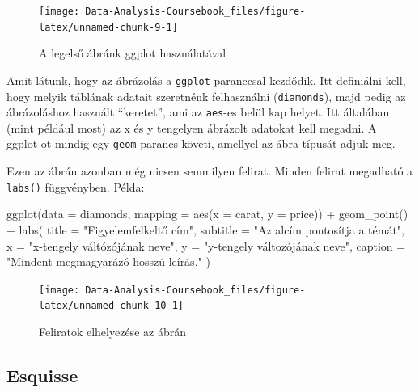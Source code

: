 \documentclass[
]{article}
\newenvironment{Shaded}{\begin{snugshade}}{\end{snugshade}}
\newcommand{\AttributeTok}[1]{\textcolor[rgb]{0.77,0.63,0.00}{#1}}
\newcommand{\FunctionTok}[1]{\textcolor[rgb]{0.00,0.00,0.00}{#1}}
\newcommand{\NormalTok}[1]{#1}
\newcommand{\SpecialCharTok}[1]{\textcolor[rgb]{0.00,0.00,0.00}{#1}}
\newcommand{\StringTok}[1]{\textcolor[rgb]{0.31,0.60,0.02}{#1}}
\begin{document}
\begin{figure}

{\centering \texttt{[image: Data-Analysis-Coursebook\_files/figure-latex/unnamed-chunk-9-1]} 

}

\caption{A legelső ábránk ggplot használatával}\label{fig:unnamed-chunk-9}
\end{figure}

Amit látunk, hogy az ábrázolás a \texttt{ggplot} paranccsal kezdődik. Itt definiálni kell, hogy melyik táblának adatait szeretnénk felhasználni (\texttt{diamonds}), majd pedig az ábrázoláshoz használt ``keretet'', ami az \texttt{aes}-es belül kap helyet. Itt általában (mint például most) az x és y tengelyen ábrázolt adatokat kell megadni. A ggplot-ot mindig egy \texttt{geom} parancs követi, amellyel az ábra típusát adjuk meg.

Ezen az ábrán azonban még nicsen semmilyen felirat. Minden felirat megadható a \texttt{labs()} függvényben. Példa:

\begin{Shaded}
\begin{Highlighting}[]
\FunctionTok{ggplot}\NormalTok{(}\AttributeTok{data =}\NormalTok{ diamonds, }\AttributeTok{mapping =} \FunctionTok{aes}\NormalTok{(}\AttributeTok{x =}\NormalTok{ carat, }\AttributeTok{y =}\NormalTok{ price)) }\SpecialCharTok{+}
  \FunctionTok{geom\_point}\NormalTok{() }\SpecialCharTok{+}
  \FunctionTok{labs}\NormalTok{(}
    \AttributeTok{title =} \StringTok{"Figyelemfelkeltő cím"}\NormalTok{,}
    \AttributeTok{subtitle =} \StringTok{"Az alcím pontosítja a témát"}\NormalTok{,}
    \AttributeTok{x =} \StringTok{"x{-}tengely váltózójának neve"}\NormalTok{,}
    \AttributeTok{y =} \StringTok{"y{-}tengely változójának neve"}\NormalTok{,}
    \AttributeTok{caption =} \StringTok{"Mindent megmagyarázó hosszú leírás."}
\NormalTok{  )}
\end{Highlighting}
\end{Shaded}

\begin{figure}

{\centering \texttt{[image: Data-Analysis-Coursebook\_files/figure-latex/unnamed-chunk-10-1]} 

}

\caption{Feliratok elhelyezése az ábrán}\label{fig:unnamed-chunk-10}
\end{figure}

\hypertarget{esquisse}{%
\subsection{Esquisse}\label{esquisse}}
\end{document}
